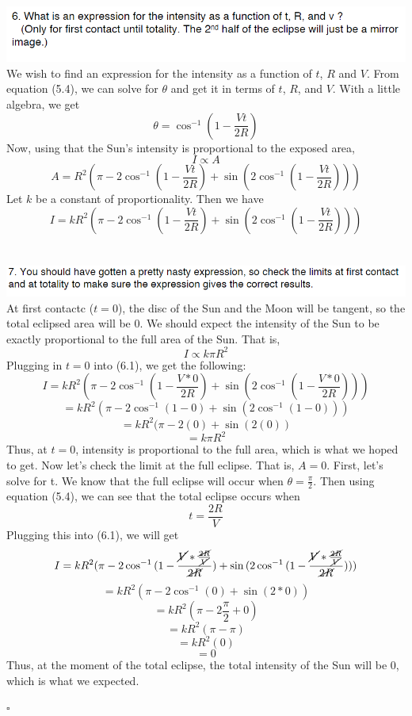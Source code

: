 \documentclass{article}
\begin{document}
\section{}
\includegraphics[scale = 0.8]{projectq6.PNG}
We wish to find an expression for the intensity as a function of $t$, $R$ and $V$. From equation (5.4), we can solve for $\theta$ and get it in terms of $t$, $R$, and $V$. With a little algebra, we get
\[\theta = \cos^{-1}{(1-\frac{Vt}{2R})}\]
Now, using that the Sun's intensity is proportional to the exposed area,
\[I \propto A\]
\[ A =  R^2(\pi - 2\cos^{-1}{(1-\frac{Vt}{2R})} + \sin{(2\cos^{-1}{(1-\frac{Vt}{2R})})})\]
Let $k$ be a constant of proportionality. Then we have
\begin{equation}
    I = kR^2(\pi - 2\cos^{-1}{(1-\frac{Vt}{2R})} + \sin{(2\cos^{-1}{(1-\frac{Vt}{2R})})})
\end{equation}

\section{}
\includegraphics[scale = 0.8]{projectq7.PNG}
At first contactc ($t=0$), the disc of the Sun and the Moon will be tangent, so the total eclipsed area will be $0$. We should expect the intensity of the Sun to be exactly proportional to the full area of the Sun. That is, 
\[I \propto k\pi R^2\]
Plugging in $t=0$ into (6.1), we get the following:
\[I = kR^2(\pi - 2\cos^{-1}{(1-\frac{V*0}{2R})} + \sin{(2\cos^{-1}{(1-\frac{V*0}{2R})})})\]
\[ = kR^2(\pi -2\cos^{-1}{(1-0)} + \sin{(2\cos^{-1}{(1-0)})})\]
\[ = kR^2(\pi - 2(0) + \sin{(2(0))}\]
\[ = k\pi R^2\]
Thus, at $t = 0$, intensity is proportional to the full area, which is what we hoped to get. Now let's check the limit at the full eclipse. That is, $A = 0$. First, let's solve for t. We know that the full eclipse will occur when $\theta = \frac{\pi}{2}$. Then using equation (5.4), we can see that the total eclipse occurs when 
\[t = \frac{2R}{V}\]
Plugging this into (6.1), we will get
\[I = kR^2(\pi - 2\cos^{-1}{(1 - \frac{\cancel{V}*\frac{\cancel{2R}}{\cancel{V}}}{\cancel{2R}})} + \sin{(2\cos^{-1}{(1 - \frac{\cancel{V}*\frac{\cancel{2R}}{\cancel{V}}}{\cancel{2R}})})})\]
\[ = kR^2(\pi - 2\cos^{-1}{(0)} + \sin{(2*0)})\]
\[ = kR^2(\pi - 2\frac{\pi}{2} + 0)\]
\[ = kR^2(\pi - \pi)\]
\[ = kR^2(0)\]
\[ = 0\]
Thus, at the moment of the total eclipse, the total intensity of the Sun will be $0$, which is what we expected.
\begin{flushright}
    $\square$
\end{flushright}
\end{document}
